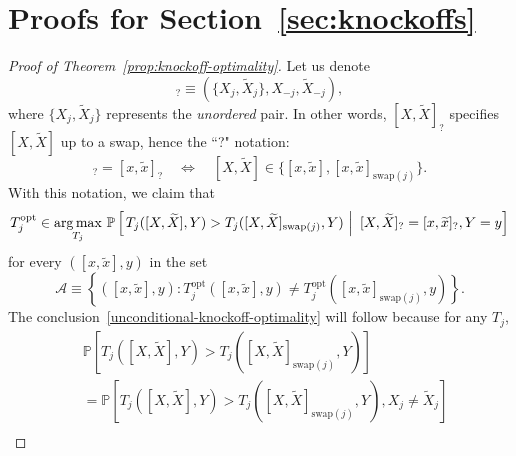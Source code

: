 \documentclass[12pt]{article}
\theoremstyle{definition}
\theoremstyle{remark}
\newcommand{\srx}{X}
\newcommand{\sfx}{x}
\newcommand{\srz}{Z}
\newcommand{\srxk}{\widetilde X}
\newcommand{\sfxk}{\widetilde x}
\newcommand{\sry}{Y}
\newcommand{\sfy}{y}
\begin{document}
\section{Proofs for Section~\ref{sec:knockoffs}} \label{sec:knockoffs-proofs}

\begin{proof}[Proof of Theorem~\ref{prop:knockoff-optimality}]
	Let us denote
	\begin{equation*}
	[\srx, \srxk]_{?} \equiv (\{\srx_j, \srxk_j\}, \srx_{-j}, \srxk_{-j}),
	\end{equation*}
	where $\{\srx_j, \srxk_j\}$ represents the \textit{unordered} pair. In other words, $[\srx, \srxk]_{?}$ specifies $[\srx, \srxk]$ up to a swap, hence the ``?" notation: 
	\begin{equation*}
	[\srx, \srxk]_{?} = [\sfx, \sfxk]_{?} \quad \Longleftrightarrow \quad [\srx, \srxk] \in \{[\sfx, \sfxk], [\sfx, \sfxk]_{\text{swap}(j)}\}.
	\end{equation*}
	With this notation, we claim that
	\begin{equation}
	T_j^{\textnormal{opt}} \in \underset{T_j}{\arg \max}\ \mathbb P\left[\left. T_j([\srx, \srxk], \sry) > T_j([\srx, \srxk]_{\text{swap}(j)}, \sry)\ \right|\ [\srx, \srxk]_? = [\sfx, \sfxk]_?, \sry = \sfy\right] 
	\label{knockoff-conditional-optimality}
	\end{equation}
	for every $([\sfx, \sfxk], \sfy)$ in the set 
	\begin{equation}
	\mathcal A \equiv \left\{([\sfx, \sfxk], \sfy): T^{\text{opt}}_j([\sfx, \sfxk], \sfy) \neq T^{\text{opt}}_j([\sfx, \sfxk]_{\text{swap}(j)}, \sfy)\right\}. 
	\label{nondegeneracy}
	\end{equation}
	The conclusion~\eqref{unconditional-knockoff-optimality} will follow because for any $T_j$, 
	\begin{equation*}
	\begin{split}
	&\mathbb P[T_j([\srx, \srxk], \sry) > T_j([\srx, \srxk]_{\text{swap}(j)}, \sry)] \\
	&= \mathbb P[T_j([\srx, \srxk], \sry) > T_j([\srx, \srxk]_{\text{swap}(j)}, \sry), \srx_j \neq \srxk_j] \\

\end{split}
\end{equation*}
\end{proof}
\end{document}
